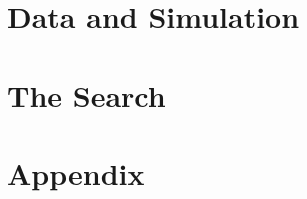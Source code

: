 \documentclass[oneside,12pt,final]{sty/ucthesis-CA2012}
\begin{document}
\begin{mainmatter}
\part{Data and Simulation}


\part{The Search}






\part{Appendix}
\appendix
\dsp




\end{mainmatter}

\ssp


\end{document}
